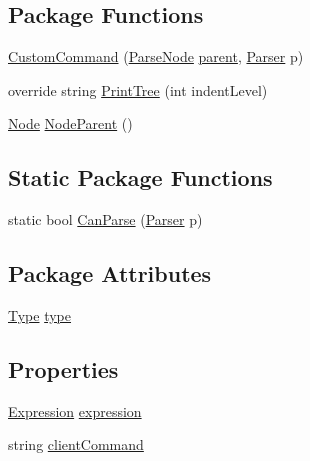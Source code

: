 \subsection*{Package Functions}
\begin{DoxyCompactItemize}
\item 
\hyperlink{a00032_a49150c9046dcad61d61ce35c51816313}{Custom\-Command} (\hyperlink{a00063}{Parse\-Node} \hyperlink{a00063_af313a82103fcc2ff5a177dbb06b92f7b}{parent}, \hyperlink{a00064}{Parser} p)
\item 
override string \hyperlink{a00032_ad8c821f5f5671cdbac6e4a6fc0b9174b}{Print\-Tree} (int indent\-Level)
\item 
\hyperlink{a00054}{Node} \hyperlink{a00063_a580e520a29444fc23ac3660cbe514a09}{Node\-Parent} ()
\end{DoxyCompactItemize}
\subsection*{Static Package Functions}
\begin{DoxyCompactItemize}
\item 
static bool \hyperlink{a00032_a02ee2902115c823bdb46715041b3a2f6}{Can\-Parse} (\hyperlink{a00064}{Parser} p)
\end{DoxyCompactItemize}
\subsection*{Package Attributes}
\begin{DoxyCompactItemize}
\item 
\hyperlink{a00032_a1d9f9f57c44e1a0d228793b658339576}{Type} \hyperlink{a00032_a5ef3bc96812be224d91548bfcdfd4b92}{type}
\end{DoxyCompactItemize}
\subsection*{Properties}
\begin{DoxyCompactItemize}
\item 
\hyperlink{a00040}{Expression} \hyperlink{a00032_a4250d192d5b58e2404a14c68eb616f16}{expression}
\item 
string \hyperlink{a00032_a1a362244273df822233359d8fe4e9f5d}{client\-Command}
\end{DoxyCompactItemize}


